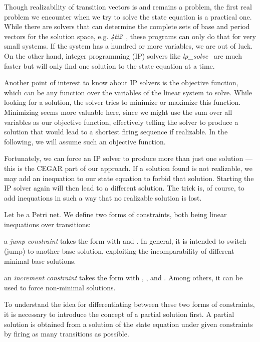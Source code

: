 \documentclass{LMCS}
\begin{document}
Though realizability of transition vectors is and remains a problem, 
the first real problem we encounter when we try to solve the
state equation is a practical one. While there are solvers that can determine the complete sets of base
and period vectors for the solution space, e.g. {\em 4ti2}~\cite{4ti2}, these programs can only do that for very
small systems. If the system has a hundred or more variables, we are out of luck. On the other hand,
integer programming (IP) solvers like {\em lp\_solve}~\cite{lpsolve} are much faster but will only find one solution 
to the state equation at a time. 

Another point of interest to know about IP solvers is the objective
function, which can be any function over the variables of the linear system to solve. 
While looking for a solution, the solver tries to minimize or maximize this function. Minimizing seems more
valuable here, since we might use the sum over all variables as our objective function, effectively telling
the solver to produce a solution that would lead to a shortest firing sequence if realizable.
In the following, we will assume such an objective function.

Fortunately, we can force an IP solver to produce more than just one solution --- this is the CEGAR part of our approach. 
If a solution found is not realizable, we may add an inequation to our state
equation to forbid that solution. Starting the IP solver again will then lead to a different solution. The trick is,
of course, to add inequations in such a way that no realizable solution is lost. 

\begin{defi}[Constraints]
Let  be a Petri net.
We define two forms of constraints, both being linear inequations over transitions:
\begin{iteMize}{}
\item a {\em jump constraint} takes the form  with  and . 
In general, it is intended to switch (jump)
to another base solution, exploiting the incomparability of different minimal base solutions.
\item an {\em increment constraint} takes the form  with , , and .
Among others, it can be used to force non-minimal solutions.
\end{iteMize}
\end{defi}

\noindent To understand the idea for differentiating between these two forms of constraints, it is necessary to introduce
the concept of a partial solution first. A partial solution is obtained from a solution of the state equation under
given constraints by firing as many transitions as possible.
\end{document}
